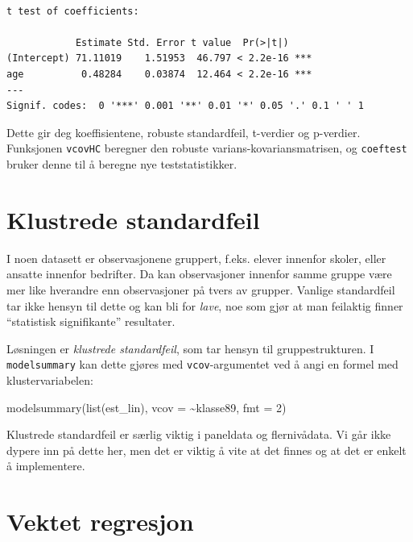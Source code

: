 \documentclass[
  norsk,
  letterpaper,
  DIV=11,
  numbers=noendperiod]{scrreprt}
\newenvironment{Shaded}{\begin{snugshade}}{\end{snugshade}}
\newcommand{\AttributeTok}[1]{\textcolor[rgb]{0.40,0.45,0.13}{#1}}
\newcommand{\DecValTok}[1]{\textcolor[rgb]{0.68,0.00,0.00}{#1}}
\newcommand{\FunctionTok}[1]{\textcolor[rgb]{0.28,0.35,0.67}{#1}}
\newcommand{\NormalTok}[1]{\textcolor[rgb]{0.00,0.23,0.31}{#1}}
\newcommand{\SpecialCharTok}[1]{\textcolor[rgb]{0.37,0.37,0.37}{#1}}
\theoremstyle{definition}
\theoremstyle{remark}
\begin{document}
\begin{verbatim}

t test of coefficients:

            Estimate Std. Error t value  Pr(>|t|)    
(Intercept) 71.11019    1.51953  46.797 < 2.2e-16 ***
age          0.48284    0.03874  12.464 < 2.2e-16 ***
---
Signif. codes:  0 '***' 0.001 '**' 0.01 '*' 0.05 '.' 0.1 ' ' 1
\end{verbatim}

Dette gir deg koeffisientene, robuste standardfeil, t-verdier og
p-verdier. Funksjonen \texttt{vcovHC} beregner den robuste
varians-kovariansmatrisen, og \texttt{coeftest} bruker denne til å
beregne nye teststatistikker.

\section{Klustrede standardfeil}\label{klustrede-standardfeil}

I noen datasett er observasjonene gruppert, f.eks. elever innenfor
skoler, eller ansatte innenfor bedrifter. Da kan observasjoner innenfor
samme gruppe være mer like hverandre enn observasjoner på tvers av
grupper. Vanlige standardfeil tar ikke hensyn til dette og kan bli for
\emph{lave}, noe som gjør at man feilaktig finner ``statistisk
signifikante'' resultater.

Løsningen er \emph{klustrede standardfeil}, som tar hensyn til
gruppestrukturen. I \texttt{modelsummary} kan dette gjøres med
\texttt{vcov}-argumentet ved å angi en formel med klustervariabelen:

\begin{Shaded}
\begin{Highlighting}[]
\FunctionTok{modelsummary}\NormalTok{(}\FunctionTok{list}\NormalTok{(est\_lin),}
             \AttributeTok{vcov =} \SpecialCharTok{\textasciitilde{}}\NormalTok{klasse89,}
             \AttributeTok{fmt =} \DecValTok{2}\NormalTok{)}
\end{Highlighting}
\end{Shaded}

Klustrede standardfeil er særlig viktig i paneldata og flernivådata. Vi
går ikke dypere inn på dette her, men det er viktig å vite at det finnes
og at det er enkelt å implementere.

\section{Vektet regresjon}\label{vektet-regresjon}
\end{document}
